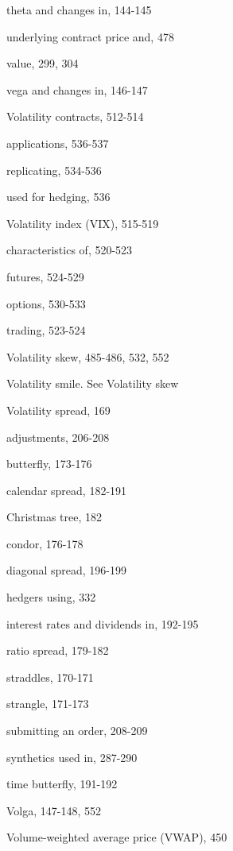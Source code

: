 \noindent theta and changes in, 144-145\par
\noindent underlying contract price and, 478\par
\noindent value, 299, 304\par
\noindent vega and changes in, 146-147\par
\noindent Volatility contracts, 512-514\par
\noindent applications, 536-537\par
\noindent replicating, 534-536\par
\noindent used for hedging, 536\par
\noindent Volatility index (VIX), 515-519\par
\noindent characteristics of, 520-523\par
\noindent futures, 524-529\par
\noindent options, 530-533\par
\noindent trading, 523-524\par
\noindent Volatility skew, 485-486, 532, 552\par
\noindent Volatility smile. See Volatility skew\par
\noindent Volatility spread, 169\par
\noindent adjustments, 206-208\par
\noindent butterfly, 173-176\par
\noindent calendar spread, 182-191\par
\noindent Christmas tree, 182\par
\noindent condor, 176-178\par
\noindent diagonal spread, 196-199\par
\noindent hedgers using, 332\par
\noindent interest rates and dividends in, 192-195\par
\noindent ratio spread, 179-182\par
\noindent straddles, 170-171\par
\noindent strangle, 171-173\par
\noindent submitting an order, 208-209\par
\noindent synthetics used in, 287-290\par
\noindent time butterfly, 191-192\par
\noindent Volga, 147-148, 552\par
\noindent Volume-weighted average price (VWAP), 450\par

